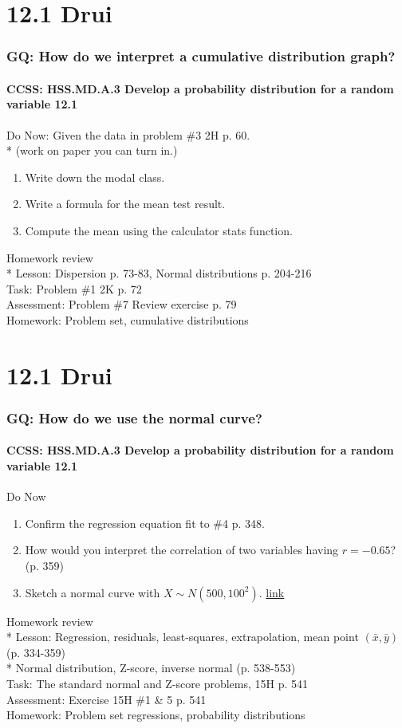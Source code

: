 \documentclass{beamer}
\begin{document}
  \section{12.1 Drui}
  \frame
  {
    \frametitle{GQ: How do we interpret a cumulative distribution graph?}
    \framesubtitle{CCSS: HSS.MD.A.3 Develop a probability distribution for a random variable \qquad \alert{12.1}}

    \begin{block}{Do Now: Given the data in problem \#3 2H p. 60.\\*
    (work on paper you can turn in.)}
      \begin{enumerate}
        \item Write down the modal class.
        \item Write a formula for the mean test result.
        \item Compute the mean using the calculator stats function.
      \end{enumerate}
   \end{block}
    Homework review\\*
    Lesson:  Dispersion p. 73-83, Normal distributions p. 204-216\\%
    Task: Problem \#1 2K p. 72\\%
    Assessment: Problem \#7 Review exercise p. 79
    \\%
    Homework: Problem set, cumulative distributions
  }



  \section{12.1 Drui}
  \frame
  {
    \frametitle{GQ: How do we use the normal curve?}
    \framesubtitle{CCSS: HSS.MD.A.3 Develop a probability distribution for a random variable \qquad \alert{12.1}}

    \begin{block}{Do Now}
      \begin{enumerate}
      \item Confirm the regression equation fit to \#4 p. 348.
      \item How would you interpret the correlation of two variables having $r=-0.65$? (p. 359)
      \item Sketch a normal curve with $X\sim N(500, 100^2)$.
      \href{https://blog.prepscholar.com/sat-standard-deviation}{link}
      \end{enumerate}
   \end{block}
    Homework review\\*
    Lesson:  Regression, residuals, least-squares, extrapolation, mean point $(\bar{x},\bar{y})$ (p. 334-359)\\*
    Normal distribution, Z-score, inverse normal (p. 538-553) \\%
    Task: The standard normal and Z-score problems, 15H p. 541\\%
    Assessment: Exercise 15H \#1 \& 5 p. 541\\%
    Homework: Problem set regressions, probability distributions
  }
\end{document}
